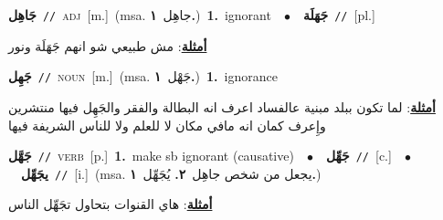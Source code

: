 \documentclass[10pt,a4paper,twoside]{article} %
\begin{document}
\begin{multicols}{2}
{\setlength\topsep{0pt}\textbf{\foreignlanguage{arabic}{جَاهِل}}\ {\color{gray}\texttt{//}\color{black}}\ \textsc{adj}\ [m.]\ \color{gray}(msa. \foreignlanguage{arabic}{جاهِل}~\foreignlanguage{arabic}{\textbf{١.}})\color{black}\ \textbf{1.}~ignorant\ \ $\bullet$\ \ \setlength\topsep{0pt}\textbf{\foreignlanguage{arabic}{جَهَلَة}}\ {\color{gray}\texttt{//}\color{black}}\ [pl.]\  \begin{flushright}\color{gray}\foreignlanguage{arabic}{\textbf{\underline{\foreignlanguage{arabic}{أمثلة}}}: مش طبيعي شو انهم جَهَلَة ونور}\end{flushright}\color{black}} \vspace{2mm}

{\setlength\topsep{0pt}\textbf{\foreignlanguage{arabic}{جَهِل}}\ {\color{gray}\texttt{//}\color{black}}\ \textsc{noun}\ [m.]\ \color{gray}(msa. \foreignlanguage{arabic}{جَهْل}~\foreignlanguage{arabic}{\textbf{١.}})\color{black}\ \textbf{1.}~ignorance\  \begin{flushright}\color{gray}\foreignlanguage{arabic}{\textbf{\underline{\foreignlanguage{arabic}{أمثلة}}}: لما تكون ببلد مبنية عالفساد اعرف انه البطالة والفقر والجَهِل فيها منتشرين وإِعرف كمان انه مافي مكان لا للعلم ولا للناس الشريفة فيها}\end{flushright}\color{black}} \vspace{2mm}

{\setlength\topsep{0pt}\textbf{\foreignlanguage{arabic}{جَهَّل}}\ {\color{gray}\texttt{//}\color{black}}\ \textsc{verb}\ [p.]\ \textbf{1.}~make sb ignorant (causative)\ \ $\bullet$\ \ \setlength\topsep{0pt}\textbf{\foreignlanguage{arabic}{جَهِّل}}\ {\color{gray}\texttt{//}\color{black}}\ [c.]\ \ $\bullet$\ \ \setlength\topsep{0pt}\textbf{\foreignlanguage{arabic}{يجَهِّل}}\ {\color{gray}\texttt{//}\color{black}}\ [i.]\ \color{gray}(msa. \foreignlanguage{arabic}{يجعل من شخص جاهِل}~\foreignlanguage{arabic}{\textbf{٢.}}  \foreignlanguage{arabic}{يُجَهِّل}~\foreignlanguage{arabic}{\textbf{١.}})\color{black}\  \begin{flushright}\color{gray}\foreignlanguage{arabic}{\textbf{\underline{\foreignlanguage{arabic}{أمثلة}}}: هاي القنوات بتحاول تجَهِّل الناس}\end{flushright}\color{black}} \vspace{2mm}


\end{multicols}
\end{document}
